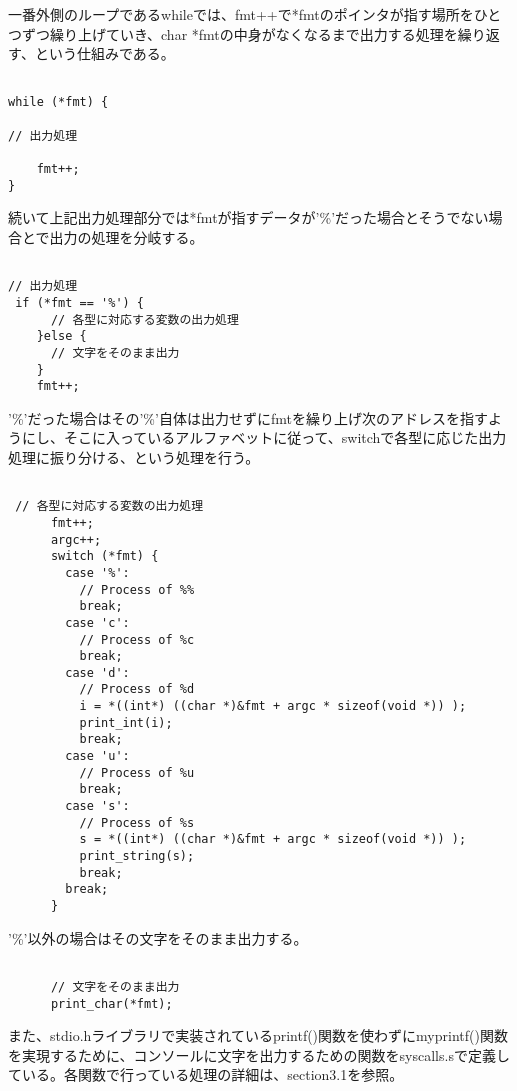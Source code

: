 \documentclass[a4j]{jarticle}
\begin{document}
一番外側のループであるwhileでは、fmt++で*fmtのポインタが指す場所をひとつずつ繰り上げていき、char *fmtの中身がなくなるまで出力する処理を繰り返す、という仕組みである。

{\baselineskip 3mm
  \begin{verbatim}

while (*fmt) {

// 出力処理

    fmt++;
}

\end{verbatim}
}

続いて上記出力処理部分では*fmtが指すデータが'\%'だった場合とそうでない場合とで出力の処理を分岐する。

{\baselineskip 3mm
  \begin{verbatim}

// 出力処理
 if (*fmt == '%') {
      // 各型に対応する変数の出力処理
    }else {
      // 文字をそのまま出力
    }
    fmt++;

\end{verbatim}
}

'\%'だった場合はその'\%'自体は出力せずにfmtを繰り上げ次のアドレスを指すようにし、そこに入っているアルファベットに従って、switchで各型に応じた出力処理に振り分ける、という処理を行う。

{\baselineskip 3mm
  \begin{verbatim}

 // 各型に対応する変数の出力処理
      fmt++;
      argc++;
      switch (*fmt) {
        case '%':
          // Process of %%
          break;
        case 'c':
          // Process of %c
          break;
        case 'd':
          // Process of %d
          i = *((int*) ((char *)&fmt + argc * sizeof(void *)) );
          print_int(i);
          break;
        case 'u':
          // Process of %u
          break;
        case 's':
          // Process of %s
          s = *((int*) ((char *)&fmt + argc * sizeof(void *)) );
          print_string(s);
          break;
        break;
      }

\end{verbatim}
}

'\%'以外の場合はその文字をそのまま出力する。

{\baselineskip 3mm
  \begin{verbatim}

      // 文字をそのまま出力 
      print_char(*fmt);

\end{verbatim}
}


また、stdio.hライブラリで実装されているprintf()関数を使わずにmyprintf()関数を実現するために、コンソールに文字を出力するための関数をsyscalls.sで定義している。各関数で行っている処理の詳細は、section3.1を参照。 
\end{document}
